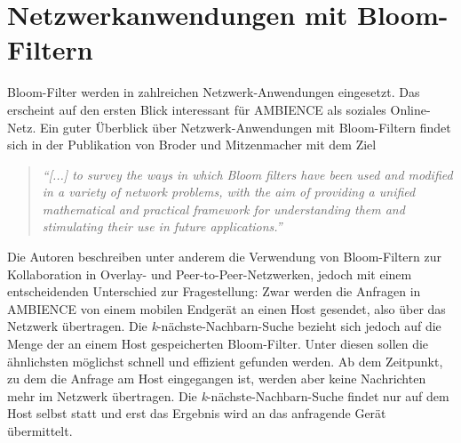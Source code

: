 \section{Netzwerkanwendungen mit Bloom-Filtern}\label{sec:bloom-netzwerk}
Bloom-Filter werden in zahlreichen Netzwerk-Anwendungen eingesetzt. Das erscheint auf den ersten Blick interessant für AMBIENCE als soziales Online-Netz. Ein guter Überblick über Netzwerk-Anwendungen mit Bloom-Filtern findet sich in der Publikation von Broder und Mitzenmacher mit dem Ziel 
\begin{quote}
\textit{"`[...] to survey the ways in which Bloom filters have been used and modified in a variety of network problems, with the aim of providing a unified mathematical and practical framework for understanding them and stimulating their use in future applications."'} \cite{Broder2004}
\end{quote}
Die Autoren beschreiben unter anderem die Verwendung von Bloom-Filtern zur Kollaboration in Overlay- und Peer-to-Peer-Netzwerken, jedoch mit einem entscheidenden Unterschied zur Fragestellung: Zwar werden die Anfragen in AMBIENCE von einem mobilen Endgerät an einen Host gesendet, also über das Netzwerk übertragen. Die \textit{k}-nächste-Nachbarn-Suche bezieht sich jedoch auf die Menge der an einem Host gespeicherten Bloom-Filter. Unter diesen sollen die ähnlichsten möglichst schnell und effizient gefunden werden. Ab dem Zeitpunkt, zu dem die Anfrage am Host eingegangen ist, werden aber keine Nachrichten mehr im Netzwerk übertragen. Die \textit{k}-nächste-Nachbarn-Suche findet nur auf dem Host selbst statt und erst das Ergebnis wird an das anfragende Gerät übermittelt. 

